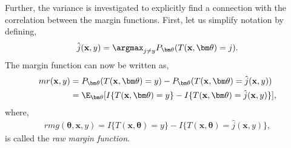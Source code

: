 Further, the variance is investigated to explicitly find a connection with the correlation between the margin functions.  
First, let us simplify notation by defining,
\begin{align}
  \hat j(\mathbf{x}, y) = \argmax_{j \neq y} P_{\bm \theta}(T(\mathbf{x}, \bm \theta) = j).
\end{align}
The margin function can now be written as,
\begin{align}
  mr(\mathbf{x},y) 
  &= P_{\bm \theta}(T(\mathbf{x},\bm \theta) = y) - P_{\bm \theta} (T(\mathbf{x}, \bm \theta) = \hat j (\mathbf{x}, y)) \notag \\
  &= \E_{\bm \theta}[I\{T(\mathbf{x},\bm \theta) = y\} - I\{T(\mathbf{x}, \bm \theta) = \hat j (\mathbf{x}, y)\}],
\end{align}
where,
\begin{align}
  rmg(\bm \theta, \mathbf{x}, y) = I\{T(\mathbf{x},\bm \theta) = y\} - I\{T(\mathbf{x}, \bm \theta) = \hat j (\mathbf{x}, y)\},
\end{align}
is called the \textit{raw margin function}.

